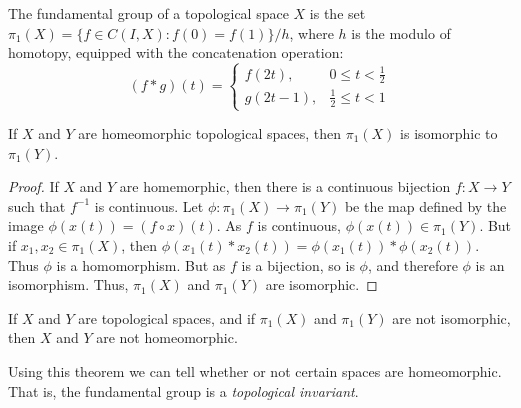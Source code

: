 \documentclass[crop=false,class=article,oneside]{standalone}
\begin{document}
        \begin{definition}
            The fundamental group of a topological space
            $X$ is the set
            $\pi_{1}(X)=\{f\in{C(I,X)}:f(0)=f(1)\}/h$,
            where $h$ is the modulo of homotopy,
            equipped with the concatenation operation:
            \begin{equation*}
                (f*g)(t)=
                \begin{cases}
                    f(2t),&0\leq{t}<\frac{1}{2}\\
                    g(2t-1),&\frac{1}{2}\leq{t}<1
                \end{cases}
            \end{equation*}
        \end{definition}
        \begin{theorem}
            If $X$ and $Y$ are homeomorphic topological
            spaces, then $\pi_{1}(X)$ is isomorphic
            to $\pi_{1}(Y)$.
        \end{theorem}
        \begin{proof}
            If $X$ and $Y$ are homemorphic, then there is
            a continuous bijection
            $f:X\rightarrow{Y}$ such that $f^{-1}$ is
            continuous.
            Let $\phi:\pi_{1}(X)\rightarrow\pi_{1}(Y)$
            be the map defined by the image
            $\phi(x(t))=(f\circ{x})(t)$. As $f$ is
            continuous, $\phi(x(t))\in\pi_{1}(Y)$.
            But if $x_{1},x_{2}\in\pi_{1}(X)$, then
            $\phi(x_{1}(t)*x_{2}(t))%
             =\phi(x_{1}(t))*\phi(x_{2}(t))$. Thus
            $\phi$ is a homomorphism. But as
            $f$ is a bijection, so is $\phi$, and
            therefore $\phi$ is an isomorphism.
            Thus, $\pi_{1}(X)$ and
            $\pi_{1}(Y)$ are isomorphic.
        \end{proof}
        \begin{theorem}
            If $X$ and $Y$ are topological spaces,
            and if $\pi_{1}(X)$ and $\pi_{1}(Y)$
            are not isomorphic, then
            $X$ and $Y$ are not homeomorphic.
        \end{theorem}
        Using this theorem we can tell whether or not
        certain spaces are homeomorphic. That is,
        the fundamental group is a
        \textit{topological invariant}.
\end{document}
